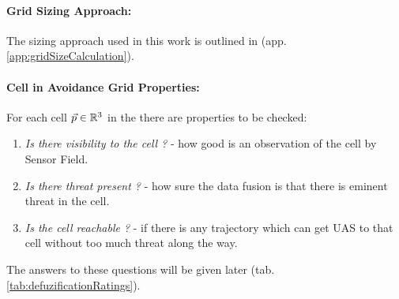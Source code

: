 \paragraph{Grid Sizing Approach:} The sizing approach used in this work is outlined in (app. \ref{app:gridSizeCalculation}).


\paragraph{Cell in Avoidance Grid Properties:}\noindent For each cell $\vec{p}\in\mathbb{R}^3$ in the there are properties to be checked:

\begin{enumerate}
    \item \emph{Is there visibility to the cell ?} - how good is an observation of the cell by Sensor Field.
    
    \item \emph{Is there threat present ?} - how sure the data fusion is that there is eminent threat in the cell.
    
    \item \emph{Is the cell reachable ?} - if there is any trajectory which can get UAS to that cell without too much threat along the way.
\end{enumerate}

\noindent The answers to these questions will be given later (tab. \ref{tab:defuzificationRatings}).
